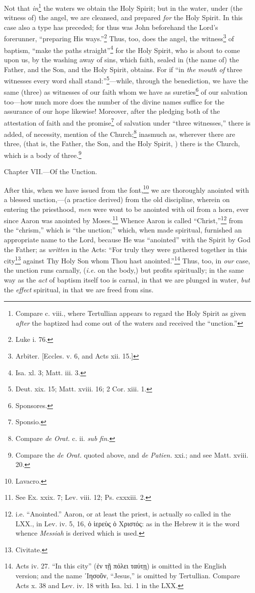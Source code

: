 Not that \emph{in}\footnote{Compare c. viii., where Tertullian appears to regard the Holy Spirit as given \emph{after} the baptized had come out of the waters and received the “unction.”} the waters we obtain the Holy Spirit; but in the water, under (the witness of) the angel, we are cleansed, and prepared \emph{for} the Holy Spirit. In this case also a type has preceded; for thus was John beforehand the Lord’s forerunner, “preparing His ways.”\footnote{Luke i. 76.} Thus, too, does the angel, the witness\footnote{Arbiter. [Eccles. v. 6, and Acts xii. 15.]} of baptism, “make the paths straight”\footnote{Isa. xl. 3; Matt. iii. 3.} for the Holy Spirit, who is about to come upon us, by the washing away of sins, which faith, sealed in (the name of) the Father, and the Son, and the Holy Spirit, obtains. For if “in \emph{the mouth of} three witnesses every word shall stand:”\footnote{Deut. xix. 15; Matt. xviii. 16; 2 Cor. xiii. 1.}—while, through the benediction, we have the same (three) as witnesses of our faith whom we have as sureties\footnote{Sponsores.} of our salvation too—how much more does the number of the divine names suffice for the assurance of our hope likewise! Moreover, after the pledging both of the attestation of faith and the promise\footnote{Sponsio.} of salvation under “three witnesses,” there is added, of necessity, mention of the Church;\footnote{Compare \emph{de Orat.} c. ii. \emph{sub fin.}} inasmuch as, wherever there are three, (that is, the Father, the Son, and the Holy Spirit, ) there is the Church, which is a body of three.\footnote{Compare the \emph{de Orat.} quoted above, and \emph{de Patien.} xxi.; and see Matt. xviii. 20.}


Chapter VII.—Of the Unction.

After this, when we have issued from the font,\footnote{Lavacro.} we are thoroughly anointed with a blessed unction,—(a practice derived) from the old discipline, wherein on entering the priesthood, \emph{men} were wont to be anointed with oil from a horn, ever since Aaron was anointed by Moses.\footnote{See Ex. xxix. 7; Lev. viii. 12; Ps. cxxxiii. 2.} Whence Aaron is called “Christ,”\footnote{i.e. “Anointed.” Aaron, or at least the priest, is actually so called in the LXX., in Lev. iv. 5, 16, \textgreek{ὁ ἱερεὺς ὁ Χριστός}: as in the Hebrew it is the word whence \emph{Messiah} is derived which is used.} from the “chrism,” which is “the unction;” which, when made spiritual, furnished an appropriate name to the Lord, because He was “anointed” with the Spirit by God the Father; as \emph{written} in the Acts: “For truly they were gathered together in this city\footnote{Civitate.} against Thy Holy Son whom Thou hast anointed.”\footnote{Acts iv. 27. “In this city” (\textgreek{ἐν τῇ πόλει ταύτῃ}) is omitted in the English version; and the name \textgreek{᾽Ιησοῦν}, “Jesus,” is omitted by Tertullian. Compare Acts x. 38 and Lev. iv. 18 with Isa. lxi. 1 in the LXX.} Thus, too, in \emph{our} case, the unction runs carnally, (\emph{i.e.} on the body,) but profits spiritually; in the same way as the \emph{act} of baptism itself too is carnal, in that we are plunged in water, \emph{but} the \emph{effect} spiritual, in that we are freed from sins.

